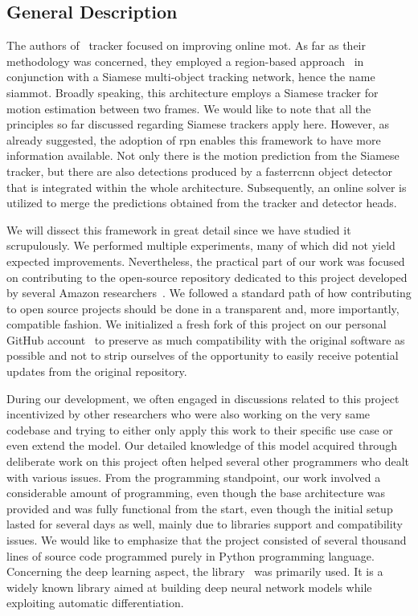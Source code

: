 
\subsection{General Description}

The authors of~\cite{shuai2021siammot} tracker focused on improving online \gls{mot}. As far as their methodology was concerned, they employed a region-based approach~\cite{ren2017fasterrcnn} in conjunction with a Siamese multi-object tracking network, hence the name \gls{siammot}. Broadly speaking, this architecture employs a Siamese tracker for motion estimation between two frames. We would like to note that all the principles so far discussed regarding Siamese trackers apply here. However, as already suggested, the adoption of \gls{rpn} enables this framework to have more information available. Not only there is the motion prediction from the Siamese tracker, but there are also detections produced by a \gls{fasterrcnn} object detector~\cite{ren2017fasterrcnn} that is integrated within the whole architecture. Subsequently, an online solver is utilized to merge the predictions obtained from the tracker and detector heads.

We will dissect this framework in great detail since we have studied it scrupulously. We performed multiple experiments, many of which did not yield expected improvements. Nevertheless, the practical part of our work was focused on contributing to the open-source repository dedicated to this project developed by several Amazon researchers~\cite{websiammotoriggithub}. We followed a standard path of how contributing to open source projects should be done in a transparent and, more importantly, compatible fashion. We initialized a fresh fork of this project on our personal GitHub account~\cite{websiammotforkgithub} to preserve as much compatibility with the original software as possible and not to strip ourselves of the opportunity to easily receive potential updates from the original repository.

During our development, we often engaged in discussions related to this project incentivized by other researchers who were also working on the very same codebase and trying to either only apply this work to their specific use case or even extend the model. Our detailed knowledge of this model acquired through deliberate work on this project often helped several other programmers who dealt with various issues. From the programming standpoint, our work involved a considerable amount of programming, even though the base architecture was provided and was fully functional from the start, even though the initial setup lasted for several days as well, mainly due to libraries support and compatibility issues. We would like to emphasize that the project consisted of several thousand lines of source code programmed purely in Python programming language. Concerning the deep learning aspect, the \pytorch{} library~\cite{paszke2019pytorch} was primarily used. It is a widely known library aimed at building deep neural network models while exploiting automatic differentiation.

